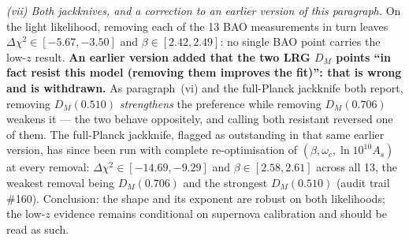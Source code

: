 \documentclass[11pt]{article}
\begin{document}
\emph{(vii) Both jackknives, and a correction to an earlier version of this paragraph.} On the light likelihood, removing each of the 13 BAO measurements in turn leaves $\Delta\chi^2 \in [-5.67, -3.50]$ and $\beta \in [2.42, 2.49]$: no single BAO point carries the low-$z$ result. \textbf{An earlier version added that the two LRG $D_M$ points ``in fact resist this model (removing them improves the fit)'': that is wrong and is withdrawn.} As paragraph~(vi) and the full-Planck jackknife both report, removing $D_M(0.510)$ \emph{strengthens} the preference while removing $D_M(0.706)$ weakens it --- the two behave oppositely, and calling both resistant reversed one of them. The full-Planck jackknife, flagged as outstanding in that same earlier version, has since been run with complete re-optimisation of $(\beta, \omega_c, \ln 10^{10}A_s)$ at every removal: $\Delta\chi^2 \in [-14.69, -9.29]$ and $\beta \in [2.58, 2.61]$ across all 13, the weakest removal being $D_M(0.706)$ and the strongest $D_M(0.510)$ (audit trail \#160). Conclusion: the shape and its exponent are robust on both likelihoods; the low-$z$ evidence remains conditional on supernova calibration and should be read as such.
\end{document}
